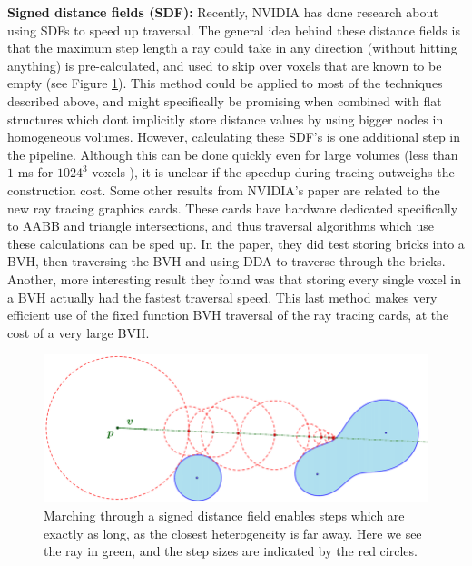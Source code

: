 \noindent\textbf{Signed distance fields (SDF):} Recently, NVIDIA has done research about using SDFs to speed up traversal\cite{soderlund2022ray}. The general idea behind these distance fields is that the maximum step length a ray could take in any direction (without hitting anything) is pre-calculated, and used to skip over voxels that are known to be empty (see Figure \ref{fig:SDF_marching}). This method could be applied to most of the techniques described above, and might specifically be promising when combined with flat structures which dont implicitly store distance values by using bigger nodes in homogeneous volumes. However, calculating these SDF's is one additional step in the pipeline. Although this can be done quickly even for large volumes (less than $1$ ms for $1024^3$ voxels \cite{cao2010parallel}), it is unclear if the speedup during tracing outweighs the construction cost. Some other results from NVIDIA's paper are related to the new ray tracing graphics cards. These cards have hardware dedicated specifically to AABB and triangle intersections, and thus traversal algorithms which use these calculations can be sped up. In the paper, they did test storing bricks into a BVH, then traversing the BVH and using DDA to traverse through the bricks. Another, more interesting result they found was that storing every single voxel in a BVH actually had the fastest traversal speed. This last method makes very efficient use of the fixed function BVH traversal of the ray tracing cards, at the cost of a very large BVH.

\begin{figure}[H]
    \centering
    \includegraphics[width=0.9\linewidth]{figures/sdf_ray_marching.png}
    \caption{Marching through a signed distance field enables steps which are exactly as long, as the closest heterogeneity is far away. Here we see the ray in green, and the step sizes are indicated by the red circles. \cite{SDF_sphere_marching}}
    \label{fig:SDF_marching}
\end{figure}

